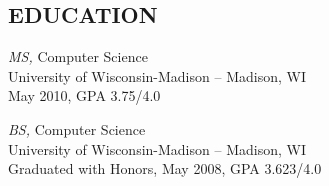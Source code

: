 \documentclass[line,margin]{res}
\begin{document}
\begin{resume}
\section{EDUCATION} {\sl MS,} Computer Science \\
        	     	University of Wisconsin-Madison -- Madison, WI \\ 
                	May 2010, GPA 3.75/4.0

					{\sl BS,} Computer Science \\
					University of Wisconsin-Madison -- Madison, WI \\
					Graduated with Honors, May 2008, GPA 3.623/4.0

\end{resume}
\end{document}
